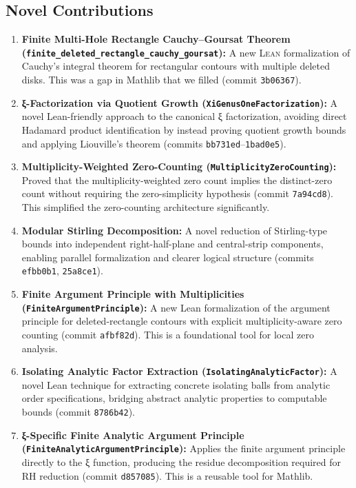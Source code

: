 \documentclass[11pt,a4paper]{article}
\newcommand{\Lean}{\textsc{Lean}\xspace}
\newcommand{\CodeName}[1]{\texttt{#1}}
\newcommand{\commit}[1]{{\small\texttt{#1}}}
\begin{document}
\subsection{Novel Contributions}

\begin{enumerate}
  \item \textbf{Finite Multi-Hole Rectangle Cauchy--Goursat Theorem (\CodeName{finite\_deleted\_rectangle\_cauchy\_goursat}):} A new \Lean formalization of Cauchy's integral theorem for rectangular contours with multiple deleted disks. This was a gap in Mathlib that we filled (commit \commit{3b06367}).

  \item \textbf{ξ-Factorization via Quotient Growth (\CodeName{XiGenusOneFactorization}):} A novel Lean-friendly approach to the canonical ξ factorization, avoiding direct Hadamard product identification by instead proving quotient growth bounds and applying Liouville's theorem (commits \commit{bb731ed}--\commit{1bad0e5}).

  \item \textbf{Multiplicity-Weighted Zero-Counting (\CodeName{MultiplicityZeroCounting}):} Proved that the multiplicity-weighted zero count implies the distinct-zero count without requiring the zero-simplicity hypothesis (commit \commit{7a94cd8}). This simplified the zero-counting architecture significantly.

  \item \textbf{Modular Stirling Decomposition:} A novel reduction of Stirling-type bounds into independent right-half-plane and central-strip components, enabling parallel formalization and clearer logical structure (commits \commit{efbb0b1}, \commit{25a8ce1}).

  \item \textbf{Finite Argument Principle with Multiplicities (\CodeName{FiniteArgumentPrinciple}):} A new Lean formalization of the argument principle for deleted-rectangle contours with explicit multiplicity-aware zero counting (commit \commit{afbf82d}). This is a foundational tool for local zero analysis.

  \item \textbf{Isolating Analytic Factor Extraction (\CodeName{IsolatingAnalyticFactor}):} A novel Lean technique for extracting concrete isolating balls from analytic order specifications, bridging abstract analytic properties to computable bounds (commit \commit{8786b42}).

  \item \textbf{ξ-Specific Finite Analytic Argument Principle (\CodeName{FiniteAnalyticArgumentPrinciple}):} Applies the finite argument principle directly to the ξ function, producing the residue decomposition required for RH reduction (commit \commit{d857085}). This is a reusable tool for Mathlib.
\end{enumerate}
\end{document}
